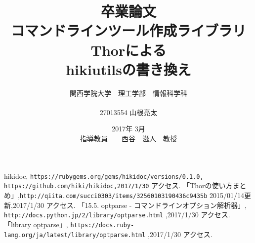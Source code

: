 \documentclass[12pt,a4paper]{jsarticle}
\begin{document}
\title{卒業論文\\
\vspace{4cm} コマンドラインツール作成ライブラリThorによる\\hikiutilsの書き換え}
\author{ 関西学院大学　理工学部　情報科学科\\\\27013554 山根亮太}
\date{\vspace{3cm} 2017年  3月\\
\vspace{3cm} 指導教員　　西谷　滋人　教授}
\maketitle
\setcounter{tocdepth}{4}

\tableofcontents





\begin{thebibliography}{99}
   hikidoc, \verb|https://rubygems.org/gems/hikidoc/versions/0.1.0,| \verb|https://github.com/hiki/hikidoc,2017/1/30| アクセス.
   「Thorの使い方まとめ」,\verb|http://qiita.com/succi0303/items/32560103190436c9435b| 2015/01/14更新,2017/1/30 アクセス.
   「15.5. optparse - コマンドラインオプション解析器」, \verb|http://docs.python.jp/2/library/optparse.html| ,2017/1/30 アクセス.
   「library optparse」, \verb|https://docs.ruby-lang.org/ja/latest/library/optparse.html| ,2017/1/30 アクセス.
\end{thebibliography}
\end{document}

